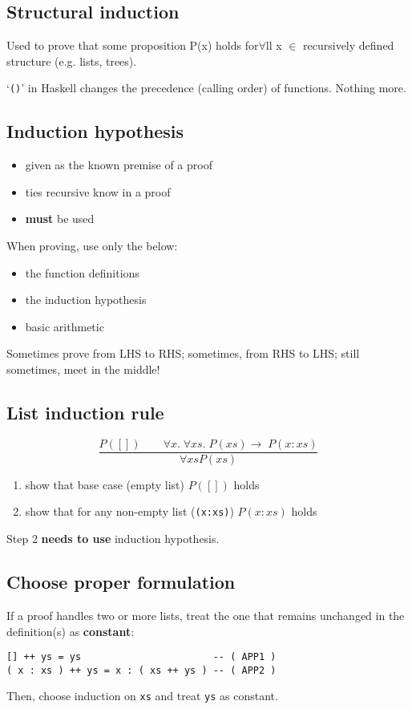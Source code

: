 \documentclass[10pt,a4paper,landscape]{article}
\begin{document}
\begin{multicols*}{3}
\section{Structural induction}
Used to prove that some proposition P(x) holds for$\forall$ll x $\in$ recursively defined structure (e.g. lists, trees).

`\verb|()|' in Haskell changes the precedence (calling order) of functions. Nothing more.
\subsection*{Induction hypothesis}
\begin{itemize}
\item given as the known premise of a proof
\item ties recursive know in a proof
\item \textbf{must} be used
\end{itemize}
When proving, use only the below:
\begin{itemize}
\item the function definitions
\item the induction hypothesis
\item basic arithmetic
\end{itemize}
Sometimes prove from LHS to RHS; sometimes, from RHS to LHS; still sometimes, meet in the middle!
\subsection*{List induction rule}
\begin{displaymath}
\frac{P([])\qquad \forall x.\; \forall xs.\; P(xs) \rightarrow\; P(x:xs)}{\forall xs P(xs)}
\end{displaymath}
\begin{enumerate}
\item show that base case (empty list) $P([])$ holds
\item show that for any non-empty list (\verb|(x:xs)|) $P(x:xs)$ holds
\end{enumerate}
Step 2 \textbf{needs to use} induction hypothesis.

\subsection*{Choose proper formulation}
If a proof handles two or more lists, treat the one that remains unchanged in the definition(s) as \textbf{constant}:
\begin{lstlisting}
[] ++ ys = ys                       -- ( APP1 )
( x : xs ) ++ ys = x : ( xs ++ ys ) -- ( APP2 )
\end{lstlisting}
Then, choose induction on \texttt{xs} and treat \texttt{ys} as constant.

\end{multicols*}
\end{document}
